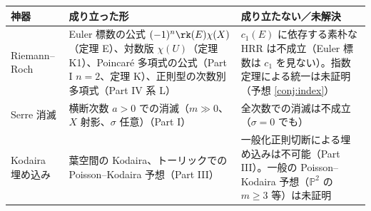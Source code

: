 \begin{center}\small
\begin{tabular}{>{\raggedright\arraybackslash}p{2.6cm}>{\raggedright\arraybackslash}p{6.2cm}>{\raggedright\arraybackslash}p{6.0cm}}
\toprule 神器 & 成り立った形 & 成り立たない／未解決\\\midrule
Riemann--Roch & Euler 標数の公式 $(-1)^n\rk(E)\chi(X)$（定理 E）、対数版 $\chi(U)$（定理 K1）、Poincar\'e 多項式の公式（Part I $n=2$、定理 K）、正則型の次数別多項式（Part IV 系 L） & $c_1(E)$ に依存する素朴な HRR は不成立（Euler 標数は $c_1$ を見ない）。指数定理による統一は未証明（予想 \ref{conj:index}）\\\midrule
Serre 消滅 & 横断次数 $a>0$ での消滅（$m\gg0$、$X$ 射影、$\sigma$ 任意）（Part I） & 全次数での消滅は不成立（$\sigma=0$ でも）\\\midrule
Kodaira 埋め込み & 葉空間の Kodaira、トーリックでの Poisson--Kodaira 予想（Part III） & 一般化正則切断による埋め込みは不可能（Part III）。一般の Poisson--Kodaira 予想（$\mathbb P^2$ の $m\ge3$ 等）は未証明\\\bottomrule
\end{tabular}
\end{center}

